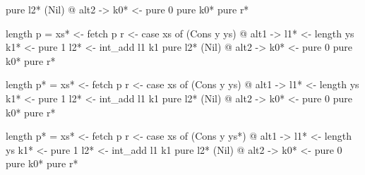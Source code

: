 \documentclass[bigger]{beamer}
\begin{document}
\begin{frame}[fragile]
\begin{center}
\begin{minipage}{0.50\textwidth}
\begin{minipage}{0.50\textwidth}
\begin{overprint}
\begin{haskellcode}
                         pure l2*
                       (Nil) @ alt2 ->
                         k0* <- pure 0
                         pure k0*
                     pure r*
                \end{haskellcode}
                \begin{haskellcode}
                   length p =
                     xs* <- fetch p
                     r <- case xs of
                       (Cons y ys) @ alt1 ->
                         l1* <- length ys
                         k1* <- pure 1
                         l2* <- int_add l1 k1
                         pure l2*
                       (Nil) @ alt2 ->
                         k0* <- pure 0
                         pure k0*
                     pure r*
                \end{haskellcode}
                \begin{haskellcode}
                   length p* =
                     xs* <- fetch p
                     r <- case xs of
                       (Cons y ys) @ alt1 ->
                         l1* <- length ys
                         k1* <- pure 1
                         l2* <- int_add l1 k1
                         pure l2*
                       (Nil) @ alt2 ->
                         k0* <- pure 0
                         pure k0*
                     pure r*
                \end{haskellcode}
                \begin{haskellcode}
                   length p* =
                     xs* <- fetch p
                     r <- case xs of
                       (Cons y ys*) @ alt1 ->
                         l1* <- length ys
                         k1* <- pure 1
                         l2* <- int_add l1 k1
                         pure l2*
                       (Nil) @ alt2 ->
                         k0* <- pure 0
                         pure k0*
                     pure r*
                \end{haskellcode}
		    

\end{overprint}
\end{minipage}
\end{minipage}
\end{center}
\end{frame}
\end{document}
